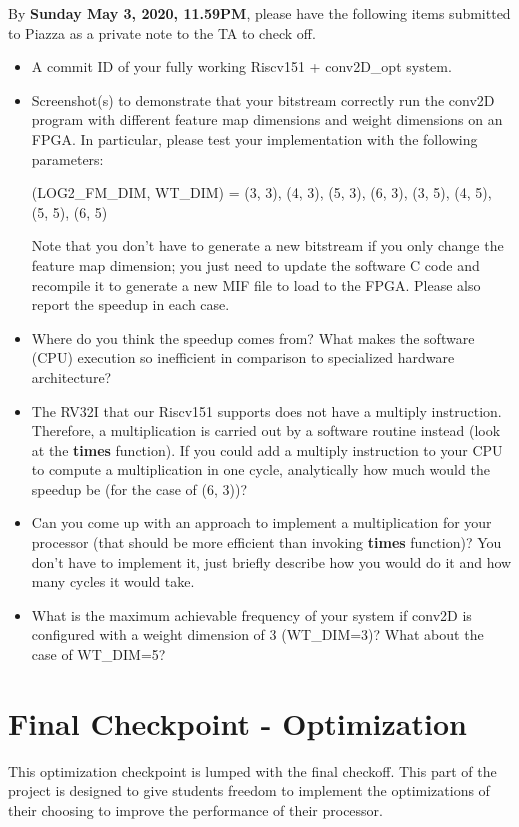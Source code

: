 \documentclass[11pt]{article}
\begin{document}
By \textbf{Sunday May 3, 2020, 11.59PM}, please have the following items submitted to Piazza as a private note to the TA to check off.

\begin{itemize}
\item A commit ID of your fully working Riscv151 + conv2D\_opt system.
\item Screenshot(s) to demonstrate that your bitstream correctly run the conv2D program with different feature map dimensions and weight dimensions on an FPGA. In particular, please test your implementation with the following parameters:

(LOG2\_FM\_DIM, WT\_DIM) = (3, 3), (4, 3), (5, 3), (6, 3),
                           (3, 5), (4, 5), (5, 5), (6, 5)

Note that you don't have to generate a new bitstream if you only change the feature map dimension; you just need to update the software C code and recompile it to generate a new MIF file to load to the FPGA. Please also report the speedup in each case.

\item Where do you think the speedup comes from? What makes the software (CPU) execution so inefficient in comparison to specialized hardware architecture?
\item The RV32I that our Riscv151 supports does not have a multiply instruction. Therefore, a multiplication is carried out by a software routine instead (look at the \textbf{times} function). If you could add a multiply instruction to your CPU to compute a multiplication in one cycle, analytically how much would the speedup be (for the case of (6, 3))?
\item Can you come up with an approach to implement a multiplication for your processor (that should be more efficient than invoking \textbf{times} function)? You don't have to implement it, just briefly describe how you would do it and how many cycles it would take.
\item What is the maximum achievable frequency of your system if conv2D is configured with a weight dimension of 3 (WT\_DIM=3)? What about the case of WT\_DIM=5?
\end{itemize} 

\newpage
\section{Final Checkpoint - Optimization}
This optimization checkpoint is lumped with the final checkoff.
This part of the project is designed to give students freedom to implement the optimizations of their choosing to improve the performance of their processor.
\end{document}
